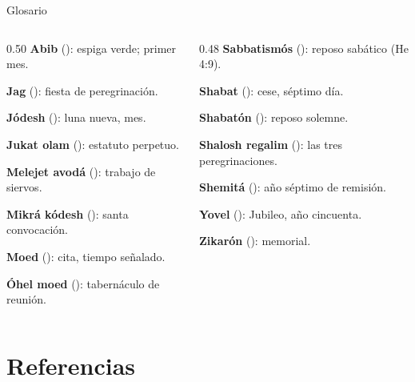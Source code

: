 \begin{frame}{Glosario}
\begin{columns}[t,onlytextwidth]
\begin{column}{0.50\textwidth}\scriptsize
\textbf{Abib} (): espiga verde; primer mes.\par
\textbf{Jag} (): fiesta de peregrinación.\par
\textbf{Jódesh} (): luna nueva, mes.\par
\textbf{Jukat olam} (): estatuto perpetuo.\par
\textbf{Melejet avodá} (): trabajo de siervos.\par
\textbf{Mikrá kódesh} (): santa convocación.\par
\textbf{Moed} (): cita, tiempo señalado.\par
\textbf{Óhel moed} (): tabernáculo de reunión.
\end{column}
\begin{column}{0.48\textwidth}\scriptsize
\textbf{Sabbatismós} (): reposo sabático (He 4:9).\par
\textbf{Shabat} (): cese, séptimo día.\par
\textbf{Shabatón} (): reposo solemne.\par
\textbf{Shalosh regalim} (): las tres peregrinaciones.\par
\textbf{Shemitá} (): año séptimo de remisión.\par
\textbf{Yovel} (): Jubileo, año cincuenta.\par
\textbf{Zikarón} (): memorial.
\end{column}
\end{columns}
\end{frame}

\section{Referencias}

